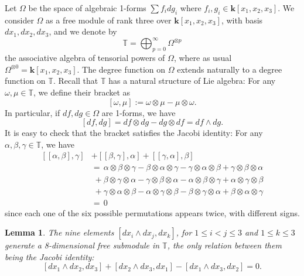 \documentclass[reqno,oneside,11pt]{amsart}
\theoremstyle{plain}
\newtheorem{lemma}[theorem]{Lemma}
\theoremstyle{definition}
\newcommand{\TT}{\mathbb{T}} %
\newcommand{\K}{\mathbf{k}}
\renewcommand{\le}{\leqslant}
\begin{document}
Let $\Omega$ be the space of algebraic 1-forms $\sum f_idg_i$ where $f_i, g_i \in \K[x_1, x_2, x_3]$.
We consider $\Omega$ as a free module of rank three over $\K[x_1, x_2, x_3]$, with basis $dx_1, dx_2, dx_3$, and we denote by
$$\TT = \bigoplus_{p = 0}^\infty \Omega^{\otimes p}$$
the associative algebra of tensorial powers of $\Omega$, where as usual $\Omega^{\otimes 0} = \K[x_1, x_2, x_3]$.
The degree function on $\Omega$ extends naturally to a degree function on $\TT$.
Recall that $\TT$ has a natural structure of Lie algebra: For any $\omega, \mu  \in \TT$, we define their bracket as
$$[\omega, \mu] := \omega \otimes \mu -  \mu \otimes \omega.$$
In particular, if $df,dg \in \Omega$ are 1-forms, we have
$$[df,dg] = df \otimes dg - dg \otimes df = df \wedge dg.$$
It is easy to check that the bracket satisfies the Jacobi identity:
For any $\alpha, \beta, \gamma \in \TT$, we have
\begin{align*}
\left[ [\alpha, \beta], \gamma \right] &+\left[ [\beta, \gamma], \alpha \right] + \left[ [\gamma, \alpha], \beta \right] \\
&= \,\alpha \otimes \beta \otimes \gamma
 - \beta \otimes \alpha \otimes \gamma
 - \gamma \otimes \alpha \otimes \beta
 + \gamma \otimes \beta \otimes \alpha \\
& \; + \beta \otimes \gamma \otimes \alpha
 - \gamma \otimes \beta \otimes \alpha
 - \alpha \otimes \beta \otimes \gamma
 + \alpha \otimes \gamma \otimes \beta \\
& \; + \gamma \otimes \alpha \otimes \beta
 - \alpha \otimes \gamma \otimes \beta
 - \beta \otimes \gamma \otimes \alpha
 + \beta \otimes \alpha \otimes \gamma \\
&= \, 0
\end{align*}
since each one of the six possible permutations appears twice, with different
signs.

\begin{lemma} \label{lem:independent}
The nine elements $\left[dx_i \wedge  dx_j,dx_k\right]$, for $1\le i <
j \le 3$ and $1 \le k \le 3$ generate a 8-dimensional free submodule in $\TT$,
the only relation between them being the Jacobi identity:
$$[dx_1 \wedge  dx_2, dx_3] + [dx_2 \wedge  dx_3, dx_1] - [dx_1 \wedge  dx_3, dx_2] = 0.$$
\end{lemma}
\end{document}
